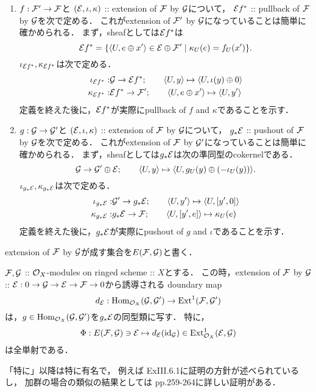 \documentclass[a4paper]{jsarticle}
\begin{document}
\begin{Def}
\begin{enumerate}[label=(\roman*), leftmargin=*]
        \item
            $f: \shF' \to \shF$と
            $(\shE, \iota, \kappa)$ :: extension of $\shF$ by $\shG$について，
            $\shE f^*$ :: pullback of $\shF$ by $\shG$を次で定める．
            これがextension of $\shF'$ by $\shG$になっていることは簡単に確かめられる．
            まず，sheafとしては$\shE f^*$は
            \[ \shE f^*=\{ \sect{U}{e \oplus x'} \in \shE \oplus \shF' \mid \kappa_U(e)=f_U(x') \}. \]
            $\iota_{\shE f^*}, \kappa_{\shE f^*}$は次で定める．
            \begin{align*}
                \iota_{\shE f^*}:&  \shG \to \shE f^*; \qquad \sect{U}{y} \mapsto \sect{U}{\iota(y) \oplus 0} \\
                \kappa_{\shE f^*}:& \shE f^* \to \shF'; \qquad \sect{U}{e \oplus x'} \mapsto \sect{U}{y'}
            \end{align*}
            定義を終えた後に，$\shE f^*$が実際にpullback of $f$ and $\kappa$であることを示す．
        \item
            $g: \shG \to \shG'$と
            $(\shE, \iota, \kappa)$ :: extension of $\shF$ by $\shG$について，
            $g_* \shE$ :: pushout of $\shF$ by $\shG$を次で定める．
            これがextension of $\shF$ by $\shG'$になっていることは簡単に確かめられる．
            まず，sheafとしては$g_* \shE$は次の準同型のcokernelである．
            \[
                \shG \to \shG' \oplus \shE;
                \qquad
                \sect{U}{y} \mapsto \sect{U}{g_U(y) \oplus (-\iota_U(y))}.
            \]
            $\iota_{g_*\shE}, \kappa_{g_*\shE}$は次で定める．
            \begin{align*}
                \iota_{g_*\shE}:&   \shG' \to g_*\shE; \qquad \sect{U}{y'} \mapsto \sect{U}{[y', 0]} \\
                \kappa_{g_*\shE}:&  g_*\shE \to \shF;  \qquad \sect{U}{[y', e]} \mapsto \kappa_U(e)
            \end{align*}
            定義を終えた後に，$g_*\shE$が実際にpushout of $g$ and $\iota$であることを示す．
    \end{enumerate}
    \end{Def}

    extension of $\shF$ by $\shG$が成す集合を$E(\shF, \shG)$と書く．
    \begin{Thm}\label{thm:ExtAndExt1}
        $\shF, \shG$
        :: $\shO_X$-modules on ringed scheme :: $X$とする．
        この時，extension of $\shF$ by $\shG$
            :: $\shE: 0 \to \shG \to \shE \to \shF \to 0$から誘導される
        doundary map
        \[ d_{\shE}: \Hom_{\shO_X}(\shG, \shG') \to \Ext^1(\shF, \shG') \]
        は，$g \in \Hom_{\shO_X}(\shG, \shG')$を$g_*\shE$の同型類に写す．
        特に，
        \[ \Phi: E(\shF, \shG) \ni \shE \mapsto d_{\shE}(\id[\shG]) \in \Ext^1_{\shO_X}(\shE, \shG) \]
        は全単射である．
    \end{Thm}
    「特に」以降は特に有名で，
    例えば\cite{HarAG} ExIII.6.1に証明の方針が述べられているし，
    加群の場合の類似の結果としては\cite{Shiho} pp.259-264に詳しい証明がある．
\end{document}
